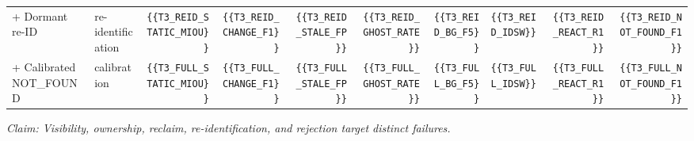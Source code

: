 \begin{table}[t]
\begin{tabular}{llrrrrrrrr}
+ Dormant re-ID & re-identification & \verb|{{T3_REID_STATIC_MIOU}}| & \verb|{{T3_REID_CHANGE_F1}}| & \verb|{{T3_REID_STALE_FP}}| & \verb|{{T3_REID_GHOST_RATE}}| & \verb|{{T3_REID_BG_F5}}| & \verb|{{T3_REID_IDSW}}| & \verb|{{T3_REID_REACT_R1}}| & \verb|{{T3_REID_NOT_FOUND_F1}}| \\
+ Calibrated NOT\_FOUND & calibration & \verb|{{T3_FULL_STATIC_MIOU}}| & \verb|{{T3_FULL_CHANGE_F1}}| & \verb|{{T3_FULL_STALE_FP}}| & \verb|{{T3_FULL_GHOST_RATE}}| & \verb|{{T3_FULL_BG_F5}}| & \verb|{{T3_FULL_IDSW}}| & \verb|{{T3_FULL_REACT_R1}}| & \verb|{{T3_FULL_NOT_FOUND_F1}}| \\
\bottomrule
\end{tabular}
\par
\smallskip
\noindent\textit{Claim: Visibility, ownership, reclaim, re-identification, and rejection target distinct failures.}
\end{table}

